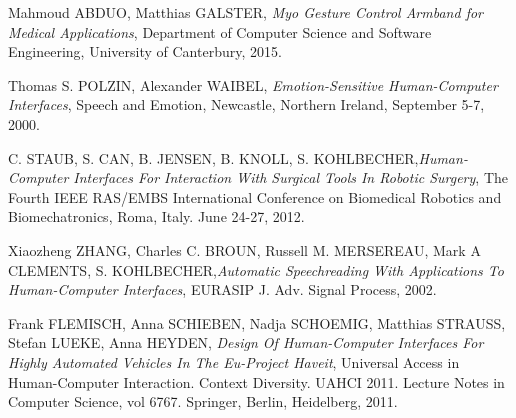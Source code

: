 \documentclass[12pt, twoside]{article}
\begin{document}
\begin{thebibliography}{24}

	Mahmoud \uppercase{Abduo}, Matthias \uppercase{Galster}, \textit{Myo Gesture Control Armband for Medical Applications}, Department of Computer Science and Software Engineering, University of Canterbury, 2015.

	Thomas S. \uppercase{Polzin}, Alexander \uppercase{Waibel}, \textit{Emotion-Sensitive Human-Computer Interfaces}, Speech and Emotion, Newcastle, Northern Ireland, September 5-7, 2000.

	C. \uppercase{Staub}, S. \uppercase{Can}, B. \uppercase{Jensen}, B. \uppercase{Knoll}, S. \uppercase{Kohlbecher},\textit{Human-Computer Interfaces For Interaction With Surgical Tools In Robotic Surgery}, The Fourth IEEE RAS/EMBS International Conference on Biomedical Robotics and Biomechatronics, Roma, Italy. June 24-27, 2012.

	Xiaozheng  \uppercase{Zhang}, Charles C. \uppercase{Broun}, Russell M. \uppercase{Mersereau}, Mark A \uppercase{Clements}, S. \uppercase{Kohlbecher},\textit{Automatic Speechreading With Applications To Human-Computer Interfaces}, EURASIP J. Adv. Signal Process, 2002.

	Frank  \uppercase{Flemisch}, Anna  \uppercase{Schieben}, Nadja \uppercase{Schoemig}, Matthias \uppercase{Strauss}, Stefan \uppercase{Lueke}, Anna  \uppercase{Heyden}, \textit{Design Of Human-Computer Interfaces For Highly Automated Vehicles In The Eu-Project Haveit}, Universal Access in Human-Computer Interaction. Context Diversity. UAHCI 2011. Lecture Notes in Computer Science, vol 6767. Springer, Berlin, Heidelberg, 2011.

\end{thebibliography}
\end{document}
